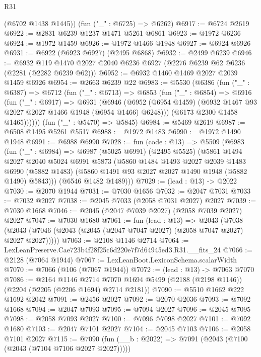 \begin{lexlean}{R31}
\begin{coremodule}
      (@6702 @1438 @1445))
    (fun ("_" : @6725) => @6262)
@6917 := @6724 @2619
@6922 := @2831 @6239 @1237 @1471 @5261 @6861
@6923 := @1972 @6236
@6924 := @1972 @1459
@6926 := @1972 @1466 @1948
@6927 := @6924 @6926
@6931 := @6922 (@6923 @6927) (@2495 @6868)
@6932 := @2499 @6239
@6946 := @6932 @119 @1470 @2027 @2040 @6236 @6927 (@2276 @6239 @62 @6236 (@2281 (@2282 @6239 @62)))
@6952 := @6932 @1460 @1469 @2027 @2039 @1459 @6926
@6954 := @2663 @6239 @22
@6983 := @5530
    (@6386
      (fun ("_" : @6387) =>
      @6712
        (fun ("_" : @6713) =>
        @6853
          (fun ("_" : @6854) =>
          @6916
            (fun ("_" : @6917) =>
            @6931
              (@6946
                (@6952 (@6954 @1459) (@6932 @1467 @93 @2027 @2027 @1466 @1948 (@6954 @1466) @6248)))
              (@6173 @2300 @1458 @1465))))))
    (fun ("_" : @5470) => @5845)
@6984 := @5469 @2619
@6987 := @6508 @1495 @5261 @5517
@6988 := @1972 @1483
@6990 := @1972 @1490 @1948
@6991 := @6988 @6990
@7028 := fun (code : @13) =>
  @5509
    (@6983
      (fun ("_" : @6984) =>
      @6987
        (@5025 @6991)
        (@2495 @5525)
        (@5861
          @1494
          @2027
          @2040
          @5024
          @6991
          @5873
          (@5860
            @1484
            @1493
            @2027
            @2039
            @1483
            @6990
            (@5882 @1483)
            (@5860 @1491 @93 @2027 @2027 @1490 @1948 (@5882 @1490) @5843)))
        (@6546 @1482 @1489)))
@7029 := (lead : @13) -> @2022
@7030 := @2070 @1944
@7031 := @7030 @1656
@7032 := @2047 @7031
@7033 := @7032 @2027
@7038 := @2045 @7033 (@2058 @7031 @2027) @2027
@7039 := @7030 @1668
@7046 := @2045 (@2047 @7039 @2027) (@2058 @7039 @2027) @2027
@7047 := @7030 @1680
@7061 := fun (lead : @13) =>
  @2043 (@7038 (@2043 (@7046 (@2043 (@2045 (@2047 @7047 @2027) (@2058 @7047 @2027) @2027 @2027)))))
@7063 := @2108 @1146 @2714
@7064 := LexLeanPreserve.Cae723b4f28f25c6d220e7f7d64945ed3.R31.__fits_24
@7066 := @2128 (@7064 @1944)
@7067 := LexLeanBoot.LexiconSchema.scalarWidth
@7070 := @7066 (@106 (@7067 @1944))
@7072 := (lead : @13) -> @7063 @7070
@7086 := @2164
    @1146
    @2714
    @7070
    @1694
    @5499
    (@2188 (@2198 @1146))
    (@2204 (@2205 (@2206 @1694) @2714 @2181))
@7090 := @5510 @1662 @222 @1692 @2042
@7091 := @2456 @2027
@7092 := @2070 @2036
@7093 := @7092 @1668
@7094 := @2047 @7093
@7095 := @7094 @2027
@7096 := @2045 @7095
@7098 := @2058 @7093 @2027
@7100 := @7096 @7098 @2027
@7101 := @7092 @1680
@7103 := @2047 @7101 @2027
@7104 := @2045 @7103
@7106 := @2058 @7101 @2027
@7115 := @7090 (fun (__b : @2022) => @7091 (@2043 (@7100 (@2043 (@7104 @7106 @2027 @2027)))))

\end{coremodule}
\end{lexlean}
